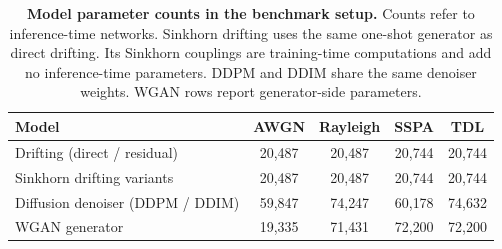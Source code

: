 \begin{table}[t]
\centering
\caption{\textbf{Model parameter counts in the benchmark setup.} Counts refer to inference-time networks. Sinkhorn drifting uses the same one-shot generator as direct drifting. Its Sinkhorn couplings are training-time computations and add no inference-time parameters. DDPM and DDIM share the same denoiser weights. WGAN rows report generator-side parameters.}
\label{tab:model-size}
\tablefontsize
\begin{tabular}{@{}lcccc@{}}
\toprule
Model & AWGN & Rayleigh & SSPA & TDL \\
\midrule
Drifting (direct / residual) & 20{,}487 & 20{,}487 & 20{,}744 & 20{,}744 \\
Sinkhorn drifting variants & 20{,}487 & 20{,}487 & 20{,}744 & 20{,}744 \\
Diffusion denoiser (DDPM / DDIM) & 59{,}847 & 74{,}247 & 60{,}178 & 74{,}632 \\
WGAN generator & 19{,}335 & 71{,}431 & 72{,}200 & 72{,}200 \\
\bottomrule
\end{tabular}
\end{table}
